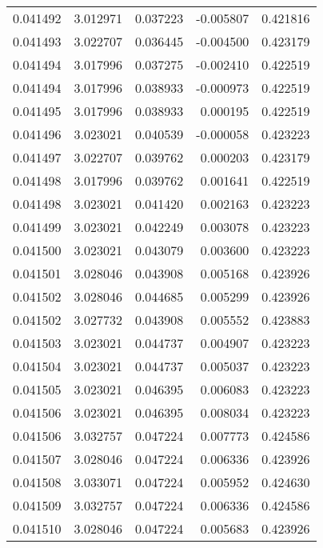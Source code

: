 \begin{tabular}{lrrrr}
0.041492    &  3.012971 &  0.037223 & -0.005807 &             0.421816 \\
0.041493    &  3.022707 &  0.036445 & -0.004500 &             0.423179 \\
0.041494    &  3.017996 &  0.037275 & -0.002410 &             0.422519 \\
0.041494    &  3.017996 &  0.038933 & -0.000973 &             0.422519 \\
0.041495    &  3.017996 &  0.038933 &  0.000195 &             0.422519 \\
0.041496    &  3.023021 &  0.040539 & -0.000058 &             0.423223 \\
0.041497    &  3.022707 &  0.039762 &  0.000203 &             0.423179 \\
0.041498    &  3.017996 &  0.039762 &  0.001641 &             0.422519 \\
0.041498    &  3.023021 &  0.041420 &  0.002163 &             0.423223 \\
0.041499    &  3.023021 &  0.042249 &  0.003078 &             0.423223 \\
0.041500    &  3.023021 &  0.043079 &  0.003600 &             0.423223 \\
0.041501    &  3.028046 &  0.043908 &  0.005168 &             0.423926 \\
0.041502    &  3.028046 &  0.044685 &  0.005299 &             0.423926 \\
0.041502    &  3.027732 &  0.043908 &  0.005552 &             0.423883 \\
0.041503    &  3.023021 &  0.044737 &  0.004907 &             0.423223 \\
0.041504    &  3.023021 &  0.044737 &  0.005037 &             0.423223 \\
0.041505    &  3.023021 &  0.046395 &  0.006083 &             0.423223 \\
0.041506    &  3.023021 &  0.046395 &  0.008034 &             0.423223 \\
0.041506    &  3.032757 &  0.047224 &  0.007773 &             0.424586 \\
0.041507    &  3.028046 &  0.047224 &  0.006336 &             0.423926 \\
0.041508    &  3.033071 &  0.047224 &  0.005952 &             0.424630 \\
0.041509    &  3.032757 &  0.047224 &  0.006336 &             0.424586 \\
0.041510    &  3.028046 &  0.047224 &  0.005683 &             0.423926 \\

\end{tabular}
